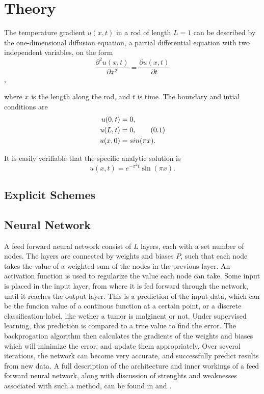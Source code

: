 \documentclass[multicolumn, 12pt]{extarticle}
\newcommand\numberthis{\addtocounter{equation}{1}\tag{\theequation}}
\begin{document}
\section{Theory}

The temperature gradient $u(x, t)$ in a rod of length $L=1$ can be described by the one-dimensional diffusion equation, a partial differential equation with two independent variables, on the form
\begin{equation}
	\label{eq:diff}
	\frac{\partial^2 u(x, t) }{\partial x^2} = \frac{\partial u(x, t)}{\partial t}
\end{equation},

where $x$ is the length along the rod, and $t$ is time. The boundary and intial conditions are
\begin{align*}
	\label{eq:boundary}
	u(0, t) & = 0,             \\
	u(L, t) & = 0, \numberthis \\
	u(x, 0) & = sin(\pi x).
\end{align*}

It is easily verifiable that the specific analytic solution is
\begin{equation*}
	u(x, t) = e^{-\pi^2t}\sin(\pi x).
\end{equation*}

\subsection{Explicit Schemes}


\subsection{Neural Network}
A feed forward neural network consist of $L$ layers, each with a set number of nodes. The layers are connected by weights and biases $P$, such that each node takes the value of a weighted sum of the nodes in the previous layer. An activation function is used to regularize the value each node can take. Some input is placed in the input layer, from where it is fed forward through the network, until it reaches the output layer. This is a prediction of the input data, which can be the funcion value of a continous function at a certain point, or a discrete classification label, like wether a tumor is malginent or not. Under supervised learning, this prediction is compared to a true value to find the error. The backprogation algorithm then calculates the gradients of the weights and biases which will minimize the error, and update them appropriately. Over several iterations, the network can become very accurate, and successfully predict results from new data. A full description of the architecture and inner workings of a feed forward neural network, along with discussion of strenghts and weaknesses associated with such a method, can be found in \cite{p2S} and \cite{p2HO}.
\end{document}
